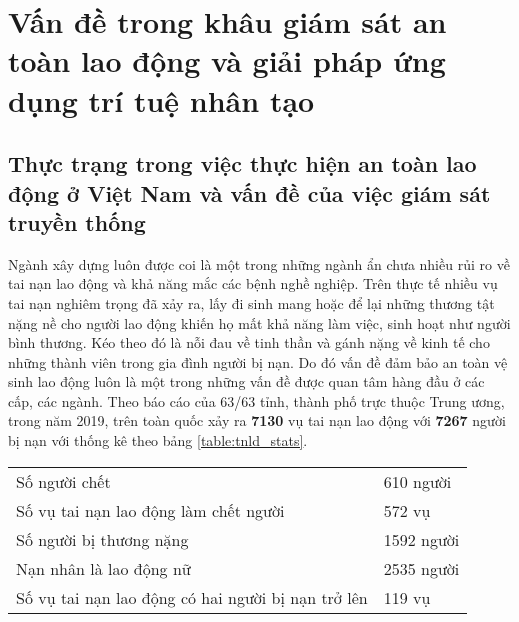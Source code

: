 \chapter{Vấn đề trong khâu giám sát an toàn lao động và giải pháp ứng dụng trí tuệ nhân tạo}
\setcounter{page}{1}
\section{Thực trạng trong việc thực hiện an toàn lao động ở Việt Nam và vấn đề của việc giám sát truyền thống}
Ngành xây dựng luôn được coi là một trong những ngành ẩn chưa nhiều rủi ro về tai nạn lao động và khả năng mắc các bệnh nghề nghiệp. Trên thực tế nhiều vụ tai nạn nghiêm trọng đã xảy ra, lấy đi sinh mang hoặc để lại những thương tật nặng nề cho người lao động khiến họ mất khả năng làm việc, sinh hoạt như người bình thương. Kéo theo đó là nỗi đau về tinh thần và gánh nặng về kinh tế cho những thành viên trong gia đình người bị nạn. Do đó vấn đề đảm bảo an toàn vệ sinh lao động luôn là một trong những vấn đề được quan tâm hàng đầu ở các cấp, các ngành. Theo báo cáo của 63/63 tỉnh, thành phố trực thuộc Trung ương\cite{tnld:2019:gov}, trong năm 2019, trên toàn quốc xảy ra \textbf{7130} vụ tai nạn lao động với \textbf{7267} người bị nạn với thống kê theo bảng \ref{table:tnld_stats}.
\begin{center}

  \begin{tabular} {l l}
  \toprule
  \midrule

  Số người chết & 610 người\\
  Số vụ tai nạn lao động làm chết người & 572 vụ\\
  Số người bị thương nặng & 1592 người \\
  Nạn nhân là lao động nữ & 2535 người \\
  Số vụ tai nạn lao động có hai người bị nạn trở lên & 119 vụ \\
          
  \bottomrule
  \end{tabular}

\end{center}

